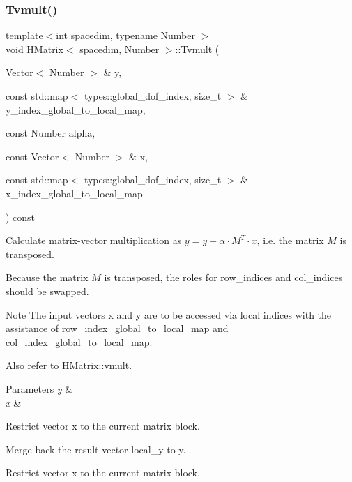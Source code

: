 \subsubsection{\texorpdfstring{Tvmult()}{Tvmult()}\hspace{0.1cm}{\footnotesize\ttfamily [4/4]}}
{\footnotesize\ttfamily template$<$int spacedim, typename Number $>$ \\
void \hyperlink{classHMatrix}{H\+Matrix}$<$ spacedim, Number $>$\+::Tvmult (\begin{DoxyParamCaption}\item[{Vector$<$ Number $>$ \&}]{y,  }\item[{const std\+::map$<$ types\+::global\+\_\+dof\+\_\+index, size\+\_\+t $>$ \&}]{y\+\_\+index\+\_\+global\+\_\+to\+\_\+local\+\_\+map,  }\item[{const Number}]{alpha,  }\item[{const Vector$<$ Number $>$ \&}]{x,  }\item[{const std\+::map$<$ types\+::global\+\_\+dof\+\_\+index, size\+\_\+t $>$ \&}]{x\+\_\+index\+\_\+global\+\_\+to\+\_\+local\+\_\+map }\end{DoxyParamCaption}) const}

Calculate matrix-\/vector multiplication as $y = y + \alpha \cdot M^T \cdot x$, i.\+e. the matrix $M$ is transposed.

Because the matrix $M$ is transposed, the roles for {\ttfamily row\+\_\+indices} and {\ttfamily col\+\_\+indices} should be swapped.


\begin{DoxyDescription}
\item[Note ]The input vectors {\ttfamily x} and {\ttfamily y} are to be accessed via local indices with the assistance of {\ttfamily row\+\_\+index\+\_\+global\+\_\+to\+\_\+local\+\_\+map} and {\ttfamily col\+\_\+index\+\_\+global\+\_\+to\+\_\+local\+\_\+map}. 
\end{DoxyDescription}

Also refer to \hyperlink{classHMatrix_aa11b5761aba86606effd14b4bdf31912}{H\+Matrix\+::vmult}. 
\begin{DoxyParams}{Parameters}
{\em y} & \\
\hline
{\em x} & \\
\hline
\end{DoxyParams}
Restrict vector x to the current matrix block.

Merge back the result vector {\ttfamily local\+\_\+y} to {\ttfamily y}.

Restrict vector x to the current matrix block.

